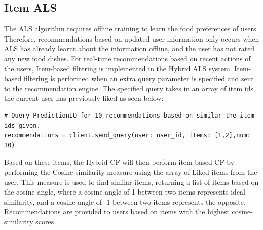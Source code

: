 \subsection{Item ALS}

The ALS algorithm requires offline training to learn the food preferences of users. Therefore, recommendations based on updated user information only occurs when ALS has already learnt about the information offline, and the user has not rated any new food dishes. For real-time recommendations based on recent actions of the users, Item-based filtering is implemented in the Hybrid ALS system. Item-based filtering is performed when an extra query parameter is specified and sent to the recommendation engine. The specified query takes in an array of item ids the current user has previously liked as seen below: 

\begin{lstlisting} 
# Query PredictionIO for 10 recommendations based on similar the item ids given.
recommendations = client.send_query(user: user_id, items: [1,2],num: 10)
\end{lstlisting}

Based on these items, the Hybrid CF will then perform item-based CF by performing the Cosine-similarity measure using the array of Liked items from the user. This measure is used to find similar items, returning a list of items based on the cosine angle, where a cosine angle of 1 between two items represents ideal similarity, and a cosine angle of -1 between two items represents the opposite. Recommendations are provided to users based on items with the highest cosine-similarity scores. 
